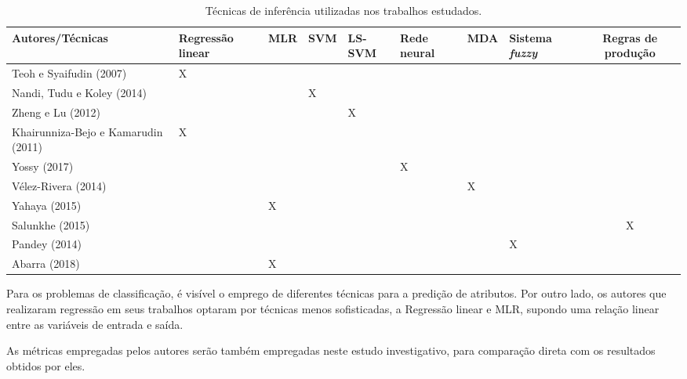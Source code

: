\begin{center}
	\begin{table}[!htb]
	\setlength{\tabcolsep}{5pt}
	\tiny
	\caption{\label{tab:artigos_inf} Técnicas de inferência utilizadas nos trabalhos estudados.}
		\begin{tabular}{>{\centering}m{3.6cm} >{\centering}m{1cm} >{\centering}m{0.8cm} >{\centering}m{0.8cm} >{\centering}m{0.8cm} >{\centering}m{1cm} >{\centering}m{0.8cm} >{\centering}m{1.3cm} c}
			\hline
			Autores/Técnicas 						& Regressão linear & MLR & SVM & LS-SVM & Rede neural & MDA & Sistema \textit{fuzzy} & Regras de produção \\ \hline
			Teoh e Syaifudin (2007)					& X &   &   &   &   &   &   &   \\ \hline 
			Nandi, Tudu e Koley (2014)				&   &   & X &   &   &   &   &   \\ \hline
			Zheng e Lu (2012)						&   &   &   & X &   &   &   &   \\ \hline 
			Khairunniza-Bejo e Kamarudin (2011)		& X &   &   &   &   &   &   &   \\ \hline 
			Yossy (2017)							&   &   &   &   & X &   &   &   \\ \hline  
			Vélez-Rivera (2014)						&   &   &   &   &   & X &   &   \\ \hline 
			Yahaya (2015)							&   & X &   &   &   &   &   &   \\ \hline 
			Salunkhe (2015)							&   &   &   &   &   &   &   & X \\ \hline 
			Pandey (2014)							&   &   &   &   &   &   & X &   \\ \hline  
			Abarra (2018)							&   & X &   &   &   &   &   &   \\  
			\hline
		\end{tabular}
	\end{table}
\end{center}

Para os problemas de classificação, é visível o emprego de diferentes técnicas para a predição de atributos. Por outro lado, os autores que realizaram regressão em seus trabalhos optaram por técnicas menos sofisticadas, a Regressão linear e MLR, supondo uma relação linear entre as variáveis de entrada e saída. 

As métricas empregadas pelos autores serão também empregadas neste estudo investigativo, para comparação direta com os resultados obtidos por eles.


